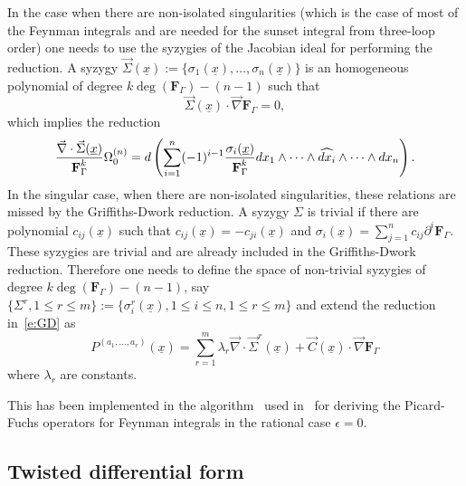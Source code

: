 \documentclass[a4paper,12pt]{article}
\numberwithin{equation}{section}
\numberwithin{figure}{section}
\begin{document}
In the case when there are non-isolated singularities (which is the
case of most of the Feynman integrals and are needed for the sunset
integral from three-loop order) one needs to use
the syzygies of the Jacobian ideal for performing the
reduction.
A syzygy  $\vec\Sigma(\underline x):=\{\sigma_1(\underline x),\dots,\sigma_n(\underline x)\}$ is an homogeneous polynomial of
degree $k \deg(\textbf{F}_\Gamma)-(n-1)$ such that
\begin{equation}
  \vec \Sigma(\underline x) \cdot \vec\nabla  \textbf{F}_\Gamma=0,
\end{equation}
%
which implies the reduction
\begin{equation}
  { \vec \nabla\cdot \vec\Sigma(\underline x) \over \textbf{F}_\Gamma^k
  }\Omega_0^{(n)}=d\left(\sum_{i=1}^n (-1)^{i-1} {\sigma_i(\underline x)\over
      \textbf{F}_\Gamma^k} dx_1\wedge \cdots \wedge
    \widehat{dx_i}\wedge \cdots \wedge dx_n\right).
\end{equation}
In the singular case, when there are non-isolated singularities, these
relations are missed by the Griffiths-Dwork reduction.
A syzygy $\Sigma$ is trivial if there are polynomial
$c_{ij}(\underline x)$ such that $c_{ij}(\underline
x)=-c_{ji}(\underline x)$ and  $\sigma_i(\underline x)= \sum_{j=1}^n
c_{ij} \partial^i \textbf{F}_\Gamma$.  These syzygies are trivial and
are already included in the Griffiths-Dwork reduction.
Therefore one needs to define the space of non-trivial syzygies of
degree $k \deg(\textbf{F}_\Gamma)-(n-1)$, say $\{\Sigma^r,1\leq r\leq m\}:=\{\sigma_i^r(\underline
x),  1\leq i\leq n,  1\leq r\leq m\}$ and extend the reduction
in~\eqref{e:GD} as 
\begin{equation}\label{e:GDsyz}
  P^{(a_1,\dots,a_r)}(\underline x)=   \sum_{r=1}^m
  \lambda_r\vec\nabla\cdot \vec \Sigma^r(\underline x)+
  \vec C(\underline
  x)\cdot \vec \nabla \textbf{F}_\Gamma
\end{equation}
where $\lambda_r$ are constants.

This has been implemented in the algorithm~\cite{lairez2016computing}
used in~\cite{Lairez:2022zkj} for deriving the Picard-Fuchs operators for
Feynman integrals in the rational case $\epsilon=0$.

\subsection{Twisted differential form}
\label{sec:non-rati-diff-form}
\end{document}
